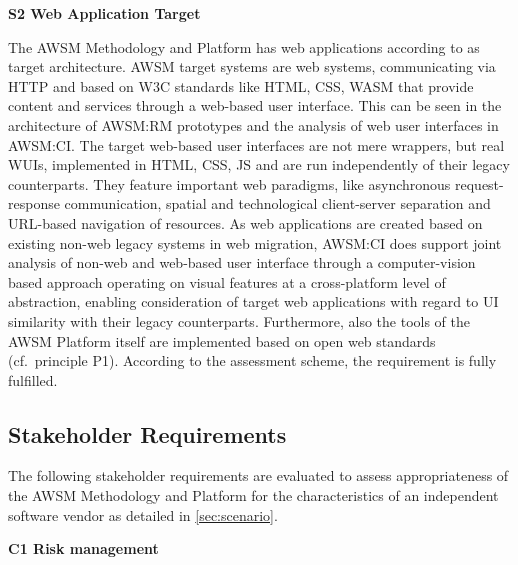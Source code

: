 \textbf{S2 Web Application Target}

The AWSM Methodology and Platform has web applications according to \autocite{def:webapplication} as target architecture.
AWSM target systems are web systems, communicating via HTTP and based on W3C standards like HTML, CSS, WASM that provide content and services through a web-based user interface.
This can be seen in the architecture of AWSM:RM prototypes and the analysis of web user interfaces in AWSM:CI.
The target web-based user interfaces are not mere wrappers, but real WUIs, implemented in HTML, CSS, JS and are run independently of their legacy counterparts.
They feature important web paradigms, like asynchronous request-response communication, spatial and technological client-server separation and URL-based navigation of resources.
As web applications are created based on existing non-web legacy systems in web migration, AWSM:CI does support joint analysis of non-web and web-based user interface through a computer-vision based approach operating on visual features at a cross-platform level of abstraction, enabling consideration of target web applications with regard to UI similarity with their legacy counterparts.
Furthermore, also the tools of the AWSM Platform itself are implemented based on open web standards (cf.~principle P1).
According to the assessment scheme, the requirement is fully fulfilled.

\hypertarget{stakeholder-requirements}{%
\subsection{Stakeholder Requirements}\label{stakeholder-requirements}}

The following stakeholder requirements are evaluated to assess appropriateness of the AWSM Methodology and Platform for the characteristics of an independent software vendor as detailed in \cref{sec:scenario}.

\textbf{C1 Risk management}

